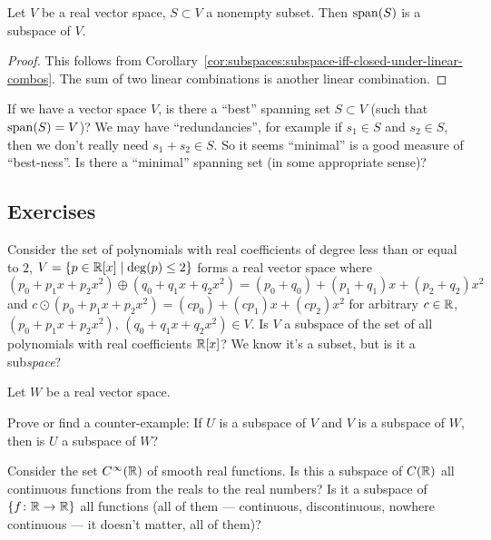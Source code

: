 \begin{proposition}
Let $V$ be a real vector space, $S\subset V$ a nonempty subset.
Then $\operatorname{span}(S)$ is a subspace of $V$.
\end{proposition}

\begin{proof}
This follows from Corollary~\ref{cor:subspaces:subspace-iff-closed-under-linear-combos}.
The sum of two linear combinations is another linear combination.
\end{proof}

If we have a vector space $V$, is there a ``best'' spanning set
$S\subset V$ (such that $\operatorname{span}(S)=V$)? We may have ``redundancies'', for
example if $s_{1}\in S$ and $s_{2}\in S$, then we don't really need
$s_{1}+s_{2}\in S$. So it seems ``minimal'' is a good measure of
``best-ness''. Is there a ``minimal'' spanning set (in some appropriate
sense)?

\subsection*{Exercises}

\begin{exercise}
Consider the set of polynomials with real coefficients 
  of degree less than or equal to $2$,
  $V=\{p\in\mathbb{R}[x]\mid\deg(p)\leq2\}$ forms a real vector space 
  where $(p_{0}+p_{1}x+p_{2}x^{2})\oplus(q_{0}+q_{1}x+q_{2}x^{2})=(p_{0}+q_{0})+(p_{1}+q_{1})x+(p_{2}+q_{2})x^{2}$
  and $c\odot(p_{0}+p_{1}x+p_{2}x^{2})=(cp_{0})+(cp_{1})x+(cp_{2})x^{2}$
  for arbitrary $c\in\mathbb{R}$,
  $(p_{0}+p_{1}x+p_{2}x^{2})$, $(q_{0}+q_{1}x+q_{2}x^{2})\in V$.
  Is $V$ a subspace of the set of all polynomials with real coefficients $\mathbb{R}[x]$?
  We know it's a subset, but is it a sub\emph{space}?
\end{exercise}

\begin{exercise}
Let $W$ be a real vector space.

Prove or find a counter-example: If $U$ is a subspace of $V$ and $V$ is
a subspace of $W$, then is $U$ a subspace of $W$?
\end{exercise}

\begin{exercise}
Consider the set $C^{\infty}(\mathbb{R})$ of smooth real functions.
Is this a subspace of $C(\mathbb{R})$ all continuous functions from the reals
to the real numbers?
Is it a subspace of $\{f\colon\mathbb{R}\to\mathbb{R}\}$ all functions (all of them --- continuous,
discontinuous, nowhere continuous --- it doesn't matter, all of them)?
\end{exercise}

